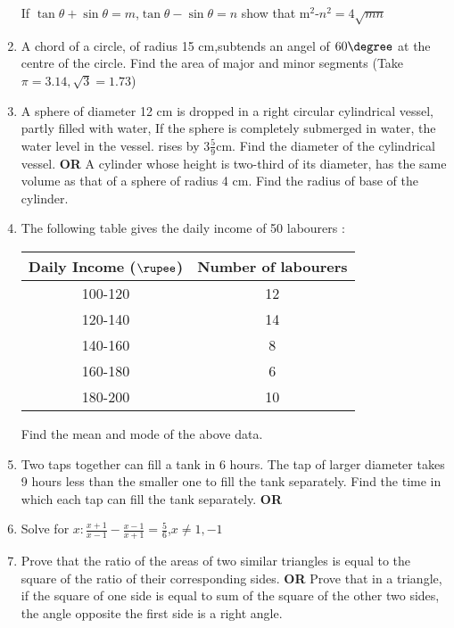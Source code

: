 \documentclass[journal,12pt,twocolumn]{IEEEtran}
\renewcommand\thesection{\arabic{section}}
\begin{document}
\begin{enumerate}[label=\thesection.\arabic*.,ref=\thesection.\theenumi]
If $\tan\theta + \sin\theta = m$,$\tan\theta-\sin\theta=n$ show that m$^2$-$n^2=4\sqrt{mn}$
\item A chord of a circle, of radius 15 cm,subtends an angel of $60\degree$ at the centre of the circle. Find the area of major and minor segments (Take $\pi=3.14, \sqrt{3}=1.73$)
\item A sphere of diameter 12 cm is dropped in a right circular cylindrical vessel, partly filled with water, If the sphere is completely submerged in water, the water level in the vessel. rises by $3\frac{5}{9}$cm. Find the diameter of the cylindrical vessel.
\newline \textbf{OR} \newline
A cylinder whose height is two-third of its diameter, has the same volume as that of a sphere of radius 4 cm. Find the radius of base of the cylinder.
\item The following table gives the daily income of 50 labourers :\\
\begin{tabular}{|c|c|}    \hline
\textbf{Daily Income ($\rupee$)} & \textbf{Number of labourers}\\    \hline
    100-120 & 12 \\    \hline
    120-140 & 14 \\    \hline
    140-160 & 8 \\    \hline
    160-180 & 6\\    \hline
    180-200 & 10\\    \hline
\end{tabular}
Find the mean and mode of the above data.
\item Two taps together can fill a tank in 6 hours. The tap of larger diameter takes 9 hours  less than the smaller one to fill the tank separately. Find the time in which each tap can fill the tank separately.
\newline \textbf{OR} \newline
\item Solve for $x : \frac{x+1}{x-1}-\frac{x-1}{x+1}=\frac{5}{6}$,$x\neq1,-1$\\
\newline
\item Prove that the ratio of the areas of two similar triangles is equal to the square of the ratio of their corresponding sides.
\newline \textbf{OR} 
\newline
Prove that in a triangle, if the square of one side is equal to sum of the square of the other two sides, the angle opposite the first side is a right angle.\\

\end{enumerate}
\end{document}
